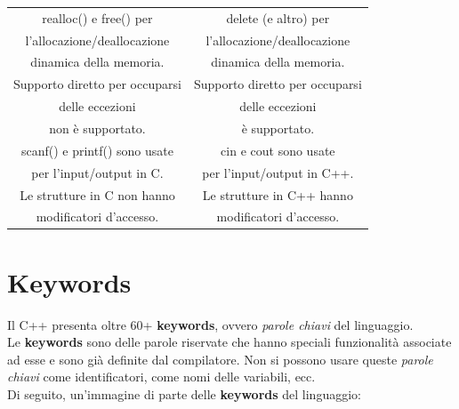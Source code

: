 \begin{longtable}{|c|c|}
	\textsf{\small realloc() e free() per } & \textsf{\small delete (e altro) per  } \\
	\textsf{\small l'allocazione/deallocazione } & \textsf{\small l'allocazione/deallocazione } \\
	\textsf{\small  dinamica della memoria.} & \textsf{\small dinamica della memoria.} \\
	\hline
	\textsf{\small Supporto diretto per occuparsi} & \textsf{\small Supporto diretto per occuparsi} \\
	\textsf{\small delle eccezioni } & \textsf{\small delle eccezioni } \\
	\textsf{\small non è supportato.} & \textsf{\small è supportato.} \\
	\hline
	\textsf{\small scanf() e printf() sono usate} & \textsf{\small cin e cout sono usate} \\
	\textsf{\small per l'input/output in C.} & \textsf{\small per l'input/output in C++.} \\
	\hline
	\textsf{\small Le strutture in C non hanno} & \textsf{\small Le strutture in C++ hanno} \\
	\textsf{\small modificatori d'accesso.} & \textsf{\small modificatori d'accesso.} \\
	\hline
\end{longtable}


\section{Keywords}

\textsf{\small Il C++ presenta oltre 60+ \textbf{keywords}, ovvero \emph{parole chiavi} del linguaggio.} \\

\textsf{\small Le \textbf{keywords} sono delle parole riservate che hanno speciali funzionalità associate ad esse e sono già definite dal compilatore. Non si possono usare queste \emph{parole chiavi} come identificatori, come nomi delle variabili, ecc.} \\

\textsf{\small Di seguito, un'immagine di parte delle \textbf{keywords} del linguaggio: } \\

